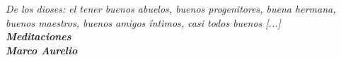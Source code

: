 \chapter*{}


\chapter*{}



\chapter*{}
\begin{flushright}
	\textit{ De los dioses: el tener buenos abuelos, buenos progenitores, buena hermana, buenos maestros, buenos amigos \'{i}ntimos, casi todos buenos [...]}\\
\vspace{1cm}
	\textbf{\textit{Meditaciones}\\
	\textit{Marco Aurelio}}\\
\end{flushright}